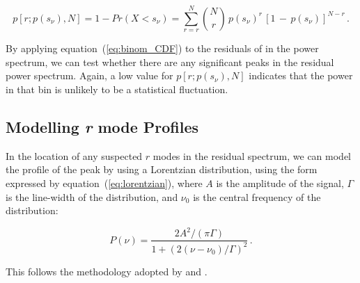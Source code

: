 \begin{equation}
p[r; p(s_\nu), N] = 1 - Pr(X < s_{\nu}) = \sum_{r=r}^{N} \binom{N}{r} \, p(s_{\nu})^r \, [1 \, - \, p(s_{\nu})]^{N-r} \, .
\label{eq:binom_CDF}
\end{equation}

By applying equation~(\ref{eq:binom_CDF}) to the residuals of in the power spectrum, we can test whether there are any significant peaks in the residual power spectrum. Again, a low value for $p[r; p(s_\nu), N]$ indicates that the power in that bin is unlikely to be a statistical fluctuation.


%
%



\subsection{Modelling {\it r} mode Profiles}
In the location of any suspected $r$ modes in the residual spectrum, we can model the profile of the peak by using a Lorentzian distribution, using the form expressed by equation~(\ref{eq:lorentzian}), where $A$ is the amplitude of the signal, $\Gamma$ is the line-width of the distribution, and $\nu_0$ is the central frequency of the distribution:

\begin{equation}
P(\nu) = \frac{2A^2/(\pi \Gamma)}{1 + (2(\nu - \nu_0)/\Gamma)^2} \, .
\label{eq:lorentzian}
\end{equation}

This follows the methodology adopted by \citet{loptien_global-scale_2018} and \citet{liang_time-distance_2019}.

